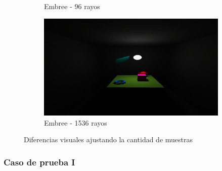 \begin{figure}[H]
\begin{subfigure}{0.45\textwidth}
		\caption{Embree - 96 rayos}
	\end{subfigure}
	\begin{subfigure}{0.45\textwidth}
		\includegraphics[width=1\linewidth]{assets/512srt}
		\caption{Embree - 1536 rayos}
	\end{subfigure}
	\caption{Diferencias visuales ajustando la cantidad de muestras}
	\label{img:difres}
\end{figure}

\subsubsection{Caso de prueba I}